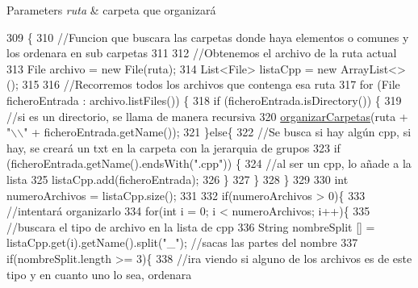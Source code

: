 \begin{DoxyParams}{Parameters}
{\em ruta} & carpeta que organizará \\
\hline
\end{DoxyParams}

\begin{DoxyCode}
309                                                \{
310         \textcolor{comment}{//Funcion que buscara las carpetas donde haya elementos o comunes y los ordenara en sub carpetas}
311         
312         \textcolor{comment}{//Obtenemos el archivo de la ruta actual}
313         File archivo = \textcolor{keyword}{new} File(ruta);
314         List<File> listaCpp = \textcolor{keyword}{new} ArrayList<>();
315         
316         \textcolor{comment}{//Recorremos todos los archivos que contenga esa ruta}
317         \textcolor{keywordflow}{for} (File ficheroEntrada : archivo.listFiles()) \{
318             \textcolor{keywordflow}{if} (ficheroEntrada.isDirectory()) \{
319                 \textcolor{comment}{//si es un directorio, se llama de manera recursiva}
320                 \mbox{\hyperlink{classactualizadordoxy_1_1_actualizador_doxy_ada45f34eba1b90fde37a09726ff2de59}{organizarCarpetas}}(ruta + \textcolor{stringliteral}{"\(\backslash\)\(\backslash\)"} + ficheroEntrada.getName());
321             \}\textcolor{keywordflow}{else}\{
322                 \textcolor{comment}{//Se busca si hay algún cpp, si hay, se creará un txt en la carpeta con la jerarquia de
       grupos}
323                 \textcolor{keywordflow}{if} (ficheroEntrada.getName().endsWith(\textcolor{stringliteral}{".cpp"})) \{
324                     \textcolor{comment}{//al ser un cpp, lo añade a la lista}
325                     listaCpp.add(ficheroEntrada);
326                 \}
327             \}
328         \}
329         
330         \textcolor{keywordtype}{int} numeroArchivos = listaCpp.size();
331         
332         \textcolor{keywordflow}{if}(numeroArchivos > 0)\{
333             \textcolor{comment}{//intentará organizarlo}
334             \textcolor{keywordflow}{for}(\textcolor{keywordtype}{int} i = 0; i < numeroArchivos; i++)\{
335                 \textcolor{comment}{//buscara el tipo de archivo en la lista de cpp}
336                 String nombreSplit [] = listaCpp.get(i).getName().split(\textcolor{stringliteral}{"\_"}); \textcolor{comment}{//sacas las partes del nombre}
337                 \textcolor{keywordflow}{if}(nombreSplit.length >= 3)\{
338                     \textcolor{comment}{//ira viendo si alguno de los archivos es de este tipo y en cuanto uno lo sea, ordenara
}
\end{DoxyCode}
